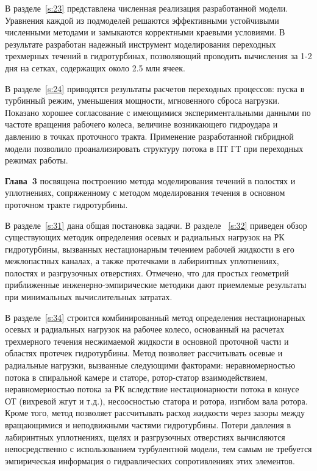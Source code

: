 В разделе~\ref{s:23} представлена численная реализация разработанной модели. 
Уравнения каждой из подмоделей решаются эффективными устойчивыми численными методами 
и замыкаются корректными краевыми условиями.  
В результате разработан надежный инструмент моделирования переходных трехмерных течений в гидротурбинах, 
позволяющий проводить вычисления за 1-2 дня на сетках, содержащих около 2.5 млн ячеек.

В разделе~\ref{s:24} приводятся результаты расчетов переходных процессов: пуска в турбинный режим, уменьшения 
мощности, мгновенного сброса нагрузки. Показано хорошее согласование с имеющимися экспериментальными данными 
по частоте вращения рабочего колеса, величине возникающего гидроудара и давлению в точках проточного тракта.
Применение разработанной гибридной модели позволило проанализировать структуру потока в ПТ ГТ 
при переходных режимах работы.

\textbf{Глава~3} посвящена построению метода моделирования течений в полостях и уплотнениях, сопряженному с 
методом моделирования течения в основном проточном тракте гидротурбины. 

В разделе~\ref{s:31} дана общая постановка задачи. В разделе ~\ref{s:32} приведен обзор существующих методик 
определения осевых и радиальных нагрузок на РК гидротурбины, вызванных нестационарным течением рабочей 
жидкости в его межлопастных каналах, а также протечками в лабиринтных уплотнениях, полостях и разгрузочных 
отверстиях. Отмечено, что для простых геометрий приближенные инженерно-эмпирические
методики дают приемлемые результаты при минимальных вычислительных затратах.

В разделе~\ref{s:34} строится комбинированный метод определения нестационарных осевых и радиальных 
нагрузок на рабочее колесо, 
основанный на расчетах трехмерного течения несжимаемой жидкости в основной проточной части и областях протечек 
гидротурбины. Метод позволяет рассчитывать осевые и радиальные нагрузки, вызванные следующими факторами: 
неравномерностью потока в спиральной камере и статоре, ротор-статор взаимодействием, неравномерностью потока 
за РК вследствие нестационарности потока в конусе ОТ (вихревой жгут и т.д.), несоосностью статора и ротора, 
изгибом вала ротора. Кроме того, метод позволяет рассчитывать расход жидкости через зазоры между вращающимися
и неподвижными частями гидротурбины. Потери давления в лабиринтных уплотнениях, щелях и разгрузочных 
отверстиях вычисляются непосредственно с использованием турбулентной модели, тем самым не требуется 
эмпирическая информация о гидравлических сопротивлениях этих элементов.

